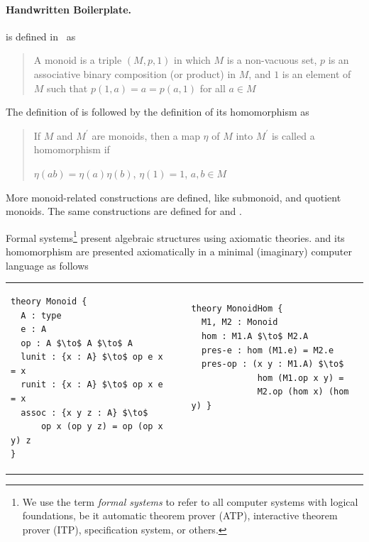 \paragraph{Handwritten Boilerplate.}
 is defined in~\cite{jacobson1985basic} as
\begin{quote}
    A monoid is a triple $(M,p,1)$ in which $M$ is a non-vacuous set, $p$ is an associative binary composition (or product) in $M$, and $1$ is an element of $M$ such that $p(1,a)= a = p(a,1)$ for all $a \in M$ 
\end{quote}
The definition of  is followed by the definition of its homomorphism as
\begin{quote}
If $M$ and $M^\prime$ are monoids, then a map $\eta$ of $M$ into $M^\prime$ is called a homomorphism if 
\begin{multicols}{3}
    $\eta(ab)=\eta(a)\eta(b)$, \vfill   
    \columnbreak
    $\eta(1) = 1$, \vfill   
    \columnbreak 
    $a,b \in M$  \vfill    
\end{multicols}
\end{quote}
More monoid-related constructions are defined, like submonoid, and quotient monoids. The same constructions are defined for  and . 

Formal systems\footnote{We use the term \emph{formal systems} to refer to all computer systems with logical foundations, be it automatic theorem prover (ATP), interactive theorem prover (ITP), specification system, or others.} present algebraic structures using axiomatic theories.  and its homomorphism are presented axiomatically in a minimal (imaginary) computer language as follows \\
\begin{tabular}[t]{p{6.3cm} p{1cm} p{6.3cm}}
\begin{lstlisting}[mathescape, basicstyle=\footnotesize]
theory Monoid { 
  A : type 
  e : A
  op : A $\to$ A $\to$ A
  lunit : {x : A} $\to$ op e x = x 
  runit : {x : A} $\to$ op x e = x 
  assoc : {x y z : A} $\to$ 
      op x (op y z) = op (op x y) z
}
\end{lstlisting}
& &
\begin{lstlisting}[mathescape, basicstyle=\footnotesize]
theory MonoidHom { 
  M1, M2 : Monoid  
  hom : M1.A $\to$ M2.A 
  pres-e : hom (M1.e) = M2.e
  pres-op : (x y : M1.A) $\to$ 
             hom (M1.op x y) = 
             M2.op (hom x) (hom y) }
             
             
             
\end{lstlisting}
\end{tabular}

